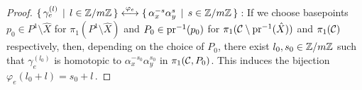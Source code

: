 \documentclass[main.tex]{subfiles}
\begin{document}
\begin{proof}
  $\{ \, \gamma_e^{(l)} \, \mid \, l \in \mathbb{Z}/m\mathbb{Z} \, \} \overset{\varphi_e}{\longleftrightarrow} \{ \, \alpha_x^{-s} \alpha_y^{s} \, \mid \, s \in \mathbb{Z}/m\mathbb{Z} \, \}$\,: \abstand
  If we choose basepoints $p_0 \in P^1 \setminus \hat{X}$ for $\pi_1(P^1 \setminus \hat{X})$ and $P_0 \in \operatorname{pr}^{-1}(p_0)$ for $\pi_1(\mathcal{C} \setminus \operatorname{pr}^{-1}(\hat{X}))$ and $\pi_1(\mathcal{C})$ respectively, then,
  depending on the choice of $P_0$, there exist $l_0, s_0 \in \mathbb{Z}/m\mathbb{Z}$ such that $\gamma_e^{(l_0)}$ is homotopic to $\alpha_x^{-s_0} \alpha_y^{s_0}$ in $\pi_1(\mathcal{C},P_0)$. This induces the bijection
  $\varphi_e(l_0+l) = s_0+l$\,. 
  \end{proof}
\end{document}

